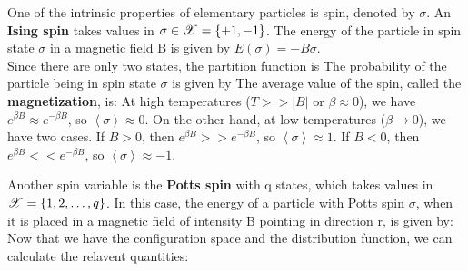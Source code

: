 \documentclass[letterpaper,english,12pt]{article}
\begin{document}
\begin{shaded*} \begin{exmp}
One of the intrinsic properties of elementary particles is spin, denoted by $\sigma$. An \textbf{Ising spin} takes values in $\sigma \in \mathscr{X} =\{+1, -1\}$. The energy of the particle in spin state $\sigma$ in a magnetic field B is given by $E(\sigma)=-B\sigma$.\\
Since there are only two states, the partition function is 
The probability of the particle being in spin state $\sigma$ is given by 
The average value of the spin, called the \textbf{magnetization}, is:
At high temperatures ($T>>|B|$ or $\beta \approx 0$), we have $e^{\beta B} \approx e^{-\beta B}$, so $\left\langle\sigma\right\rangle \approx 0$.  On the other hand, at low temperatures ($\beta \rightarrow 0$), we have two cases. If $B>0$, then $e^{\beta B} >> e^{-\beta B}$, so $\left\langle\sigma\right\rangle \approx 1$. If $B<0$, then $e^{\beta B} << e^{-\beta B}$, so $\left\langle\sigma\right\rangle \approx -1$. 
\end{exmp} \end{shaded*}
\begin{shaded*} \begin{exmp}
Another spin variable is the \textbf{Potts spin} with q states, which takes values in $\mathscr{X}=\{1,2,\ldots,q\}$. In this case, the energy of a particle with Potts spin $\sigma$, when it is placed in a magnetic field of intensity B pointing in direction r, is given by: 
Now that we have the configuration space and the distribution function, we can calculate the relavent quantities: 
\end{exmp} \end{shaded*}
\end{document}
